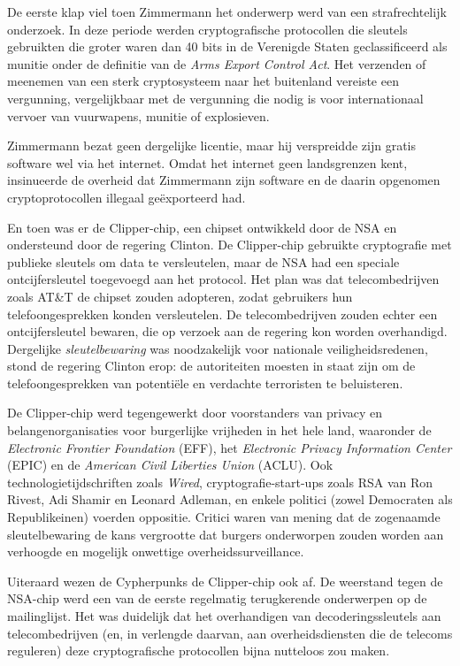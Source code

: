 \documentclass[
  a5paper,
  smalldemyvopaper,11pt,twoside,onecolumn,openright,extrafontsizes,
hidelinks]{memoir}
\begin{document}
De eerste klap viel toen Zimmermann het onderwerp werd van een
strafrechtelijk onderzoek. In deze periode werden cryptografische
protocollen die sleutels gebruikten die groter waren dan 40 bits in de
Verenigde Staten geclassificeerd als munitie onder de definitie van de
\emph{Arms Export Control Act}. Het verzenden of meenemen van een sterk
cryptosysteem naar het buitenland vereiste een vergunning, vergelijkbaar
met de vergunning die nodig is voor internationaal vervoer van
vuurwapens, munitie of explosieven.

Zimmermann bezat geen dergelijke licentie, maar hij verspreidde zijn
gratis software wel via het internet. Omdat het internet geen
landsgrenzen kent, insinueerde de overheid dat Zimmermann zijn software
en de daarin opgenomen cryptoprotocollen illegaal geëxporteerd had.

En toen was er de Clipper-chip, een chipset ontwikkeld door de NSA en
ondersteund door de regering Clinton. De Clipper-chip gebruikte
cryptografie met publieke sleutels om data te versleutelen, maar de NSA
had een speciale ontcijfersleutel toegevoegd aan het protocol. Het plan
was dat telecombedrijven zoals AT\&T de chipset zouden adopteren, zodat
gebruikers hun telefoongesprekken konden versleutelen. De
telecombedrijven zouden echter een ontcijfersleutel bewaren, die op
verzoek aan de regering kon worden overhandigd. Dergelijke
\emph{sleutelbewaring} was noodzakelijk voor nationale
veiligheidsredenen, stond de regering Clinton erop: de autoriteiten
moesten in staat zijn om de telefoongesprekken van potentiële en
verdachte terroristen te beluisteren.

De Clipper-chip werd tegengewerkt door voorstanders van privacy en
belangenorganisaties voor burgerlijke vrijheden in het hele land,
waaronder de \emph{Electronic Frontier Foundation} (EFF), het
\emph{Electronic Privacy Information Center} (EPIC) en de \emph{American
Civil Liberties Union} (ACLU). Ook technologietijdschriften zoals
\emph{Wired}, cryptografie-start-ups zoals RSA van Ron Rivest, Adi
Shamir en Leonard Adleman, en enkele politici (zowel Democraten als
Republikeinen) voerden oppositie. Critici waren van mening dat de
zogenaamde sleutelbewaring de kans vergrootte dat burgers onderworpen
zouden worden aan verhoogde en mogelijk onwettige overheidssurveillance.

Uiteraard wezen de Cypherpunks de Clipper-chip ook af. De weerstand
tegen de NSA-chip werd een van de eerste regelmatig terugkerende
onderwerpen op de mailinglijst. Het was duidelijk dat het overhandigen
van decoderingssleutels aan telecombedrijven (en, in verlengde daarvan,
aan overheidsdiensten die de telecoms reguleren) deze cryptografische
protocollen bijna nutteloos zou maken.
\end{document}
